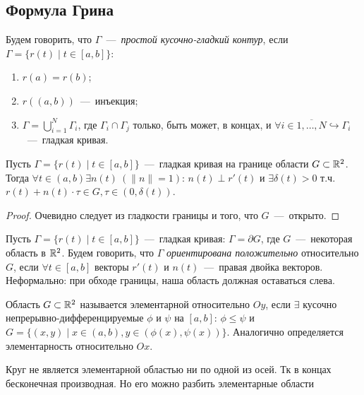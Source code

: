 \subsection{Формула Грина}
\begin{definition}
    Будем говорить, что $\Gamma$~---~\textit{простой кусочно-гладкий контур}, если $\Gamma = \{r(t) \mid t \in [a, b]\}$: 
    \begin{enumerate}
        \item $r(a) = r(b)$;
        \item $r((a, b))$~---~инъекция;
        \item $\Gamma = \bigcup\limits_{i = 1}^N \Gamma_i$, где $\Gamma_i \cap \Gamma_j$ только, быть может, в концах, и $\forall i \in \overline{1, \ldots, N} \hookrightarrow \Gamma_i$~---~гладкая кривая.
    \end{enumerate}
\end{definition}
\begin{fact}[б/д]
    Пусть $\Gamma = \{r(t) \mid t \in [a, b]\}$~---~гладкая кривая на границе области $G \subset \mathbb{R}^2$. Тогда $\forall t \in (a, b) \exists n(t) \  (\|n\| = 1)$: $ n(t) \perp r'(t)$ и $\exists \delta(t) > 0$ т.ч. $r(t) + n(t) \cdot \tau \in G, \tau \in (0, \delta(t))$.
\end{fact}
\begin{proof}
    Очевидно следует из гладкости границы и того, что $G$~---~открыто.
\end{proof}
\begin{definition}
    Пусть $\Gamma = \{r(t) \mid t \in [a, b]\}$~---~гладкая кривая: $\Gamma = \partial G$, где $G$~---~некоторая область в $\mathbb{R}^2$. Будем говорить, что $\Gamma$ \textit{ориентирована положительно} относительно $G$, если $\forall t \in [a, b]$ векторы $r'(t)$ и $n(t)$~---~правая двойка векторов. Неформально: при обходе границы, наша область должная оставаться слева.
\end{definition}
\noindent 
\begin{minipage}{0.6\textwidth}
\begin{definition}
    Область $G \subset \mathbb{R}^2$ называется элементарной относительно $Oy$, если $\exists$ кусочно непрерывно-дифференцируемые $\phi$ и $\psi$ на $[a, b]$: $\phi \leq \psi$ и $G = \{(x, y) \mid x \in (a, b), y \in (\phi(x), \psi(x))\}$. Аналогично определяется элементарность относительно $Ox$.
\end{definition}
\begin{note}
    Круг не является элементарной областью ни по одной из осей. Тк в концах бесконечная производная. Но его можно разбить элементарные области
\end{note}
\end{minipage}
